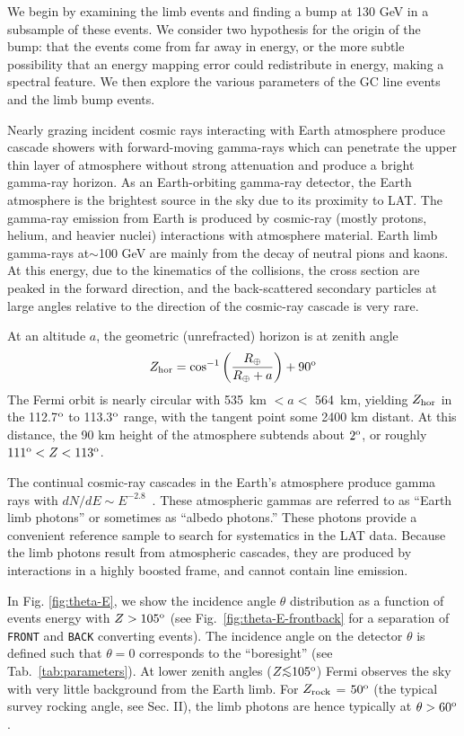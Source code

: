 \documentclass[aps,twocolumn,prd,superscriptaddress,showpacs,nofootinbib,fixfloat]{revtex4}
\newcommand{\be}{\begin{equation}}
\newcommand{\ee}{\end{equation}}
\newcommand{\degree}{^{\rm o}}
\newcommand{\zrock}{$Z_{\rm rock}$}
\def\la{\vcenter{\hbox{$<$}\offinterlineskip\hbox{$\sim$}}}
\begin{document}
We begin by examining the limb events and finding a bump at
130 GeV in a subsample of these events.  We consider two
hypothesis for the origin of the bump: that the events come
from far away in energy, or the more subtle possibility that
an energy mapping error could redistribute in energy, making
a spectral feature.  We then explore the various parameters
of the GC line events and the limb bump events.  \medskip

Nearly grazing incident cosmic rays interacting with Earth
atmosphere produce cascade showers with forward-moving
gamma-rays which can penetrate the upper thin layer of
atmosphere without strong attenuation and produce a bright
gamma-ray horizon. As an Earth-orbiting gamma-ray detector,
the Earth atmosphere is the brightest source in the sky due
to its proximity to LAT. The gamma-ray emission from Earth
is produced by cosmic-ray (mostly protons, helium, and
heavier nuclei) interactions with atmosphere material. Earth
limb gamma-rays at$\sim$100 GeV are mainly from the decay of
neutral pions and kaons. At this energy, due to the
kinematics of the collisions, the cross section are peaked
in the forward direction, and the back-scattered secondary
particles at large angles relative to the direction of the
cosmic-ray cascade is very rare.

At an altitude $a$, the geometric (unrefracted) horizon is
at zenith angle \be Z_{\rm hor} =
\cos^{-1}\left(\frac{R_\oplus}{R_\oplus+a}\right)+90\degree
\ee The Fermi orbit is nearly circular with 535~km $< a <$
564~km, yielding $Z_{\rm hor}$ in the 112.7$\degree$ to
113.3$\degree$ range, with the tangent point some 2400 km
distant.  At this distance, the 90 km height of the
atmosphere subtends about $2\degree$, or roughly $111\degree
< Z < 113\degree$.

The continual cosmic-ray cascades in the Earth's atmosphere
produce gamma rays with $dN/dE \sim
E^{-2.8}$~\citep{FermiLimb}. These atmospheric gammas are
referred to as ``Earth limb photons'' or sometimes as
``albedo photons.''  These photons provide a convenient
reference sample to search for systematics in the LAT data.
Because the limb photons result from atmospheric cascades,
they are produced by interactions in a highly boosted frame,
and cannot contain line emission.  \medskip

In Fig. \ref{fig:theta-E}, we show the incidence angle
$\theta$ distribution as a function of events energy with $Z
> 105\degree$ (see Fig.~\ref{fig:theta-E-frontback} for a
separation of \texttt{FRONT} and \texttt{BACK} converting
events).  The incidence angle on the detector $\theta$ is
defined such that $\theta=0$ corresponds to the
``boresight'' (see Tab.~\ref{tab:parameters}).  At lower
zenith angles ($Z \la 105\degree$) Fermi observes the sky
with very little background from the Earth limb.  For \zrock
= $50\degree$ (the typical survey rocking angle, see Sec.
II), the limb photons are hence typically at $\theta >
60\degree$.
\end{document}
